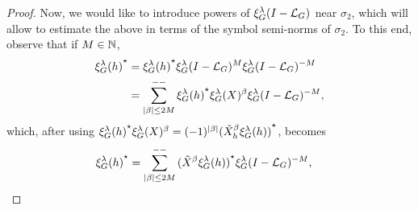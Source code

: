 \begin{proof}
    Now, we would like to introduce powers of $\xi^{\lambda}_{G} (I - {\mathcal{L}_{G}})^{}$ near $\sigma_2$,
    which will allow to estimate the above in terms of the symbol semi-norms of $\sigma_2$.
    To this end,
    observe that if $M \in \mathbb{N}$,
    \begin{align*}
        {\xi^{\lambda}_{G}(h)}^\star
        &= {\xi^{\lambda}_{G}(h)}^\star \xi^{\lambda}_{G} (I - {\mathcal{L}_{G}})^{M} \xi^{\lambda}_{G} (I - {\mathcal{L}_{G}})^{-M}\\
        &= \sum_{\left|{\beta}\right| \leq 2 M}^{--} {\xi^{\lambda}_{G}(h)}^\star \xi^{\lambda}_{G}(X)^\beta \xi^{\lambda}_{G} (I - {\mathcal{L}_{G}})^{-M},
    \end{align*}
    which, after using $\adj {\Rep \lambda(h)} \Rep \lambda (X)^\beta = (-1)^{\abs \beta} \adj {(\RightDifferentialOperator[h] \beta \Rep \lambda (h))}$, becomes
    \begin{align*}
        \adj{\Rep \lambda(h)}
        &=
        \lcsum{\abs \beta \leq 2 M}
        \adj{(\RightDifferentialOperator \beta \Rep \lambda(h))} \Rep \lambda \BesselPotentialSquared {-M},
    \end{align*}


\end{proof}
